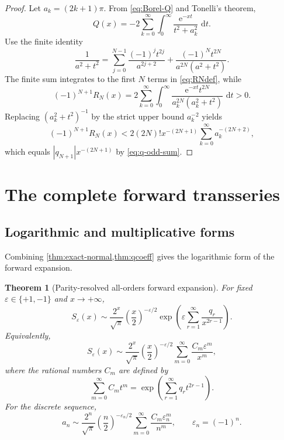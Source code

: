 \documentclass[11pt]{article}
\newtheorem{theorem}{Theorem}[section]
\theoremstyle{definition}
\theoremstyle{remark}
\newcommand{\eps}{\varepsilon}
\newcommand{\dd}{\,\mathrm d}
\newcommand{\e}{\mathrm e}
\begin{document}
\begin{proof}
Let $a_k=(2k+1)\pi$.  From \eqref{eq:Borel-Q} and Tonelli's theorem,
\[
 Q(x)=-2\sum_{k=0}^\infty\int_0^\infty
 \frac{\e^{-xt}}{t^2+a_k^2}\,\dd t.
\]
Use the finite identity
\[
 \frac1{a^2+t^2}
 =\sum_{j=0}^{N-1}\frac{(-1)^jt^{2j}}{a^{2j+2}}
 +\frac{(-1)^Nt^{2N}}{a^{2N}(a^2+t^2)}.
\]
The finite sum integrates to the first $N$ terms in \eqref{eq:RNdef}, while
\[
 (-1)^{N+1}R_N(x)
 =2\sum_{k=0}^\infty\int_0^\infty
 \frac{\e^{-xt}t^{2N}}{a_k^{2N}(a_k^2+t^2)}\,\dd t>0.
\]
Replacing $(a_k^2+t^2)^{-1}$ by the strict upper bound $a_k^{-2}$ yields
\[
 (-1)^{N+1}R_N(x)
 <2(2N)!x^{-(2N+1)}\sum_{k=0}^\infty a_k^{-(2N+2)},
\]
which equals $|q_{N+1}|x^{-(2N+1)}$ by \eqref{eq:q-odd-sum}.
\end{proof}

\section{The complete forward transseries}

\subsection{Logarithmic and multiplicative forms}

Combining \cref{thm:exact-normal,thm:qcoeff} gives the logarithmic form of the forward expansion.

\begin{theorem}[Parity-resolved all-orders forward expansion]\label{thm:forward}
For fixed $\eps\in\{+1,-1\}$ and $x\to+\infty$,
\begin{equation}\label{eq:forward-log}
 S_\eps(x)\sim
 \frac{2^x}{\sqrt\pi}\left(\frac{x}{2}\right)^{-\eps/2}
 \exp\!\left(\eps\sum_{r=1}^\infty\frac{q_r}{x^{2r-1}}\right).
\end{equation}
Equivalently,
\begin{equation}\label{eq:forward-mult}
 S_\eps(x)\sim
 \frac{2^x}{\sqrt\pi}\left(\frac{x}{2}\right)^{-\eps/2}
 \sum_{m=0}^\infty\frac{C_m\eps^m}{x^m},
\end{equation}
where the rational numbers $C_m$ are defined by
\begin{equation}\label{eq:Cgen}
 \sum_{m=0}^\infty C_mt^m
 =\exp\!\left(\sum_{r=1}^\infty q_rt^{2r-1}\right).
\end{equation}
For the discrete sequence,
\begin{equation}\label{eq:an-full}
 a_n\sim\frac{2^n}{\sqrt\pi}\left(\frac{n}{2}\right)^{-\eps_n/2}
 \sum_{m=0}^\infty\frac{C_m\eps_n^m}{n^m},
 \qquad \eps_n=(-1)^n.
\end{equation}
\end{theorem}
\end{document}
